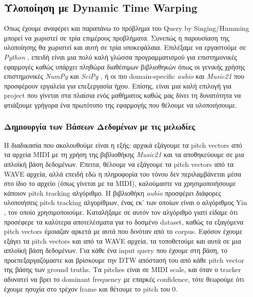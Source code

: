 \subsection{Υλοποίηση με Dynamic Time Warping}
Όπως έχουμε αναφέρει και παραπάνω το πρόβλημα του Query by Singing/Humming μπορεί να χωριστεί σε
τρία επιμέρους προβλήματα. Συνεπώς η παρουσίαση της υλοποίησης θα χωριστεί και αυτή σε τρία υποκεφάλαια.
Επιλέξαμε να εργαστούμε σε \emph{Python} \cite{python}, επειδή είναι μια πολύ καλή γλώσσα προγραμματισμού για επιστημονικές εφαρμογές καθώς υπάρχει πληθώρα διαθέσιμων βιβλιοθηκών όπως οι γενικής χρήσης επιστημονικές
\emph{NumPy} \cite{numpy} και \emph{SciPy} \cite{scipy}, ή οι πιο domain-specific \emph{aubio} \cite{aubio} και \emph{Music21}
\cite{music21} που προσφέρουν εργαλεία για επεξεργασία ήχου. Επίσης, είναι μια καλή επιλογή για project που γίνεται στα πλαίσια ενός μαθήματος καθώς μας δίνει τη δυνατότητα να φτιάξουμε γρήγορα ένα πρωτότυπο της εφαρμογής που θέλουμε να υλοποιήσουμε.

\subsubsection{Δημιουργία των Βάσεων Δεδομένων με τις μελωδίες}
Η διαδικασία που ακολουθούμε είναι η εξής: αρχικά εξάγουμε τα pitch vectors από τα αρχεία MIDI με τη χρήση της βιβλιοθήκης \emph{Music21}
\cite{music21} και τα αποθηκεύουμε σε μια απλοϊκή βάση δεδομένων. Έπειτα, θέλουμε να εξάγουμε τα pitch vectors από τα WAVE αρχεία, αλλά επειδή εδώ η
πληροφορία του τόνου δεν περιλαμβάνεται μέσα στο ίδιο το αρχείο (όπως γίνεται με τα MIDI), καλούμαστε να χρησιμοποιήσουμε κάποιον pitch
tracking αλγόριθμο. Η βιβλιοθήκη \emph{aubio} \cite{aubio} προσφέρει διάφορες υλοποιήσεις pitch tracking αλγορίθμων, ένας εκ' των οποίων
είναι ο αλγόριθμος Yin \cite{de2002yin}, τον οποίο χρησιμοποιούμε. Καταλήξαμε σε αυτόν τον αλγόριθμό γιατί είδαμε ότι προσέφερε τα καλύτερα
αποτελέσματα για το δοσμένο dataset, καθώς τα εξαγόμενα pitch vectors έμοιαζαν αρκετά με αυτά που δινόταν από το corpus. Εφόσον έχουμε εξάγει τα pitch vectors
και από τα WAVE αρχεία, τα τοποθετούμε και αυτά σε μια απλοϊκή βάση δεδομένων. Για κάθε ένα input query που έχουμε στη βάση, το
προεπεξαργαζόμαστε και βρίσκουμε την DTW απόστασή του από κάθε pitch vector της βάσης των ground truths. Τα pitches είναι σε MIDI scale, και όταν
ο tracker αδυνατεί να βρει το dominant frequency με επαρκές confidence, τότε θεωρούμε ότι έχουμε ησυχία στο τρέχον frame και θέτουμε το
pitch του 0.

